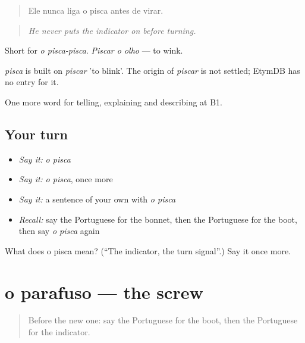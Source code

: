 \begin{quote}
Ele nunca liga o pisca antes de virar.
\end{quote}

\begin{quote}
\emph{He never puts the indicator on before turning.}
\end{quote}

Short for \emph{o pisca-pisca}. \emph{Piscar o olho} — to wink.

\begin{cousinweb}
\emph{pisca} is built on \emph{piscar} 'to blink'. The origin of \emph{piscar} is not settled; EtymDB has no entry for it.
\end{cousinweb}

\begin{grammarlens}[title={What you've built}]
One more word for telling, explaining and describing at B1.
\end{grammarlens}

\subsection*{Your turn}
\begin{itemize}
\raggedright
  \item \emph{Say it:} \emph{o pisca}
  \item \emph{Say it:} \emph{o pisca}, once more
  \item \emph{Say it:} a sentence of your own with \emph{o pisca}
  \item \emph{Recall:} say the Portuguese for the bonnet, then the Portuguese for the boot, then say \emph{o pisca} again
\end{itemize}

\begin{tcolorbox}[breakable,colback=teal!4,colframe=teal!35!black,title={Before you move on}]
What does o pisca mean? (\textquotedblleft{}The indicator, the turn signal\textquotedblright{}.) Say it once more.
\end{tcolorbox}
\section[o parafuso]{o parafuso — the screw}

\label{lesson:PT-C407-parafuso}



\begin{quote}
Before the new one: say the Portuguese for the boot, then the Portuguese for the indicator.
\end{quote}

